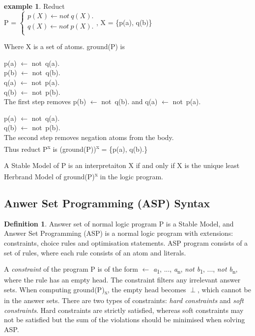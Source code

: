 \documentclass[12pt,twoside]{report}
\theoremstyle{plain}
\theoremstyle{definition}
\newtheorem{defn}[thm]{Definition} %
\newtheorem{examp}{example}[section]
\begin{document}
\begin{examp} \normalfont Reduct \\


P = $\begin{cases}
	p(X)  \leftarrow not\ q(X). \\
  	q (X) \leftarrow not\ p(X). \\
      \end{cases}$,  X = \{p(a), q(b)\}

Where X is a set of atoms. ground(P) is 

p(a)  $\leftarrow$ not\ q(a). \\
p(b)  $\leftarrow$ not\ q(b). \\
q(a) $\leftarrow$ not\ p(a). \\
q(b) $\leftarrow$ not\ p(b). \\

 The first step removes p(b)  $\leftarrow$ not\ q(b). and q(a) $\leftarrow$ not\ p(a).

p(a)  $\leftarrow$ not\ q(a). \\
q(b) $\leftarrow$ not\ p(b). \\

The second step removes negation atoms from the body. \\
Thus reduct P\textsuperscript{x} is (ground(P))\textsuperscript{x} =  \{p(a), q(b).\}
\end{examp}
\label{reduct}

A Stable Model of P is an interpretaiton X if and only if X is the unique least Herbrand Model of ground(P)\textsuperscript{x} in the logic program.

\subsection{Anwer Set Programming (ASP) Syntax}

\begin{defn}
Answer set of normal logic program P is a Stable Model, and Answer Set Programming (ASP) is a normal logic program with extensions: constraints, choice rules and optimisation statements. ASP program consists of a set of rules, where each rule consists of an atom and literals.
\end{defn}


A \textit{constraint} of the program P is of the form $\leftarrow$ \textit{a}\textsubscript{1}, ..., \textit{a}\textsubscript{n}, \textit{not b}\textsubscript{1}, ..., \textit{not b}\textsubscript{n}, where the rule has an empty head. The constraint filters any irrelevant answer sets. When computing ground(P)\textsubscript{x}, the empty head becomes $\perp$, which cannot be in the answer sets.
There are two types of constraints: \textit{hard constraints} and \textit{soft constraints}. Hard constraints are strictly satisfied, whereas soft constraints may not be satisfied but the sum of the violations should be minimised when solving ASP.
\end{document}
